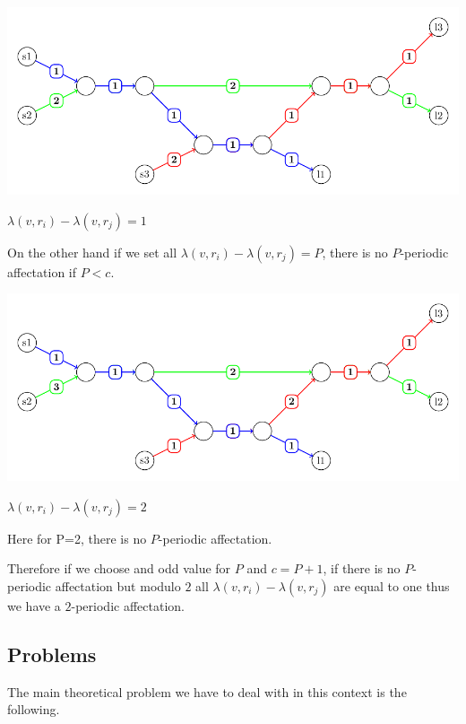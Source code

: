 \documentclass[a4paper,10pt]{article}
\begin{document}
      \includegraphics[scale=0.5]{Fig5.pdf}\\
       \begin{center}
      $\lambda(v,r_i) - \lambda(v,r_j)=1$ 
     \end{center}

      On the other hand if we set all $\lambda(v,r_i) - \lambda(v,r_j)=P$, there is no $P$-periodic affectation if $P<c$.

   
      \includegraphics[scale=0.5]{Fig6.pdf}\\
       \begin{center}
      $\lambda(v,r_i) - \lambda(v,r_j)=2$ 

     
      Here for P=2, there is no $P$-periodic affectation.
      \end{center}

      Therefore if we choose and odd value for $P$ and $c=P+1$, if there is no $P$-periodic affectation but modulo $2$ all $\lambda(v,r_i) - \lambda(v,r_j)$
      are equal to one thus we have a $2$-periodic affectation. 


   \subsection{Problems}

      The main theoretical problem we have to deal with in this context is the following.\\
\end{document}

